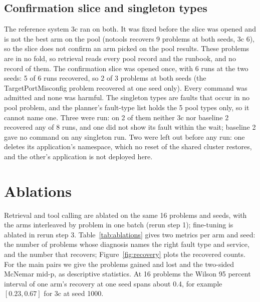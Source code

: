 \documentclass[10pt,conference]{IEEEtran}
\begin{document}
\subsection{Confirmation slice and singleton types}

The reference system 3c ran on both. It was fixed before the slice was opened and is not the best
arm on the pool (notools recovers 9 problems at both seeds, 3c 6), so the slice does not confirm an
arm picked on the pool results. These problems are in no fold, so retrieval reads every pool record
and the runbook, and no record of them. The confirmation slice was opened once, with 6 runs at
the two seeds: 5 of 6 runs recovered, so 2 of 3 problems at both seeds (the TargetPortMisconfig
problem recovered at one seed only). Every command was admitted and none was harmful. The
singleton types are faults that occur in no pool problem, and the planner's fault-type list holds
the 5 pool types only, so it cannot name one. Three were run: on 2 of them neither 3c nor baseline 2
recovered any of 8 runs, and one did not show its fault within the wait; baseline 2 gave no command
on any singleton run. Two were left out before any run: one deletes its application's namespace,
which no reset of the shared cluster restores, and the other's application is not deployed here.

\section{Ablations}
\label{sec:ablations}



Retrieval and tool calling are ablated on the same 16 problems and seeds, with the arms
interleaved by problem in one batch (rerun step 1); fine-tuning is ablated in rerun step 3.
Table~\ref{tab:ablations} gives two metrics per arm and seed: the
number of problems whose diagnosis names the right fault type and service, and the number that
recovers; Figure~\ref{fig:recovery} plots the recovered counts.
For the main pairs we give the problems gained and lost and the two-sided
McNemar mid-p, as descriptive statistics. At 16 problems the Wilson 95 percent interval of one
arm's recovery at one seed spans about 0.4, for example $[0.23, 0.67]$ for 3c at seed 1000.
\end{document}
